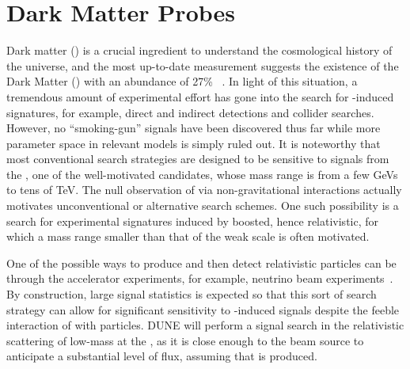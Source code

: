 


\section{Dark Matter Probes}
Dark matter () is a crucial ingredient to understand the cosmological history of the universe, and the most up-to-date measurement suggests the existence of the Dark Matter
() with an abundance of 27\% ~\cite{Aghanim:2018eyx}. 
In light of this situation, a tremendous amount of experimental effort has gone into %
the search for -induced signatures, for example,  direct and indirect detections and collider searches. However, no ``smoking-gun'' signals have been discovered thus far while more parameter space in relevant  models is simply ruled out. %
It is noteworthy that most conventional  search strategies are designed to be sensitive to signals from the , one of the well-motivated  candidates, whose mass range is from a few GeVs to tens of TeV. 
The null observation of  via non-gravitational interactions actually motivates unconventional or alternative  search schemes. 
One such possibility is %
a search for experimental signatures induced by boosted, hence relativistic,  for which %
a mass range smaller than that of the weak scale is often motivated. 

One of the possible ways to produce and then detect relativistic  particles can be through the accelerator experiments, 
for example, neutrino beam experiments~\cite{Alexander:2016aln, Battaglieri:2017aum, LoSecco:1980nf, Acciarri:2015uup}. 
By construction, large signal statistics is expected so that this sort of search strategy can allow for significant
sensitivity to -induced signals despite the feeble interaction of  with  particles. %
DUNE will perform a signal search in the relativistic scattering of low-mass  at the , as it is close enough to the beam source to anticipate a substantial level of  flux, assuming that  is produced.

